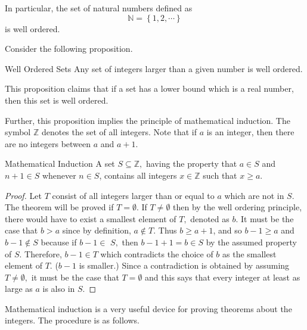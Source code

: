 In particular, the set of natural numbers defined as
\begin{equation*}
\mathbb{N} = \left\{ 1,2,\cdots \right\}
\end{equation*}
is well ordered.

Consider the following proposition.

\begin{proposition}{Well Ordered Sets}\label{prop:wellordered}
Any set of integers larger than a given number is well ordered.
\end{proposition}

This proposition claims that if a set has a lower bound which is a real number, 
then this set is well ordered.

Further, this proposition implies the principle of mathematical induction.
 The symbol $\mathbb{Z}$ denotes the set of all
integers. Note that if $a$ is an integer, then there are no integers between
$a$ and $a+1.$

\begin{theorem}{Mathematical Induction}\label{thm:mathinduction}
 A set $S\subseteq \mathbb{Z},$ having
the property that $a\in S$ and $n+1\in S$ whenever $n\in S$, contains all
integers $x\in \mathbb{Z}$ such that $x\geq a.$
\end{theorem}

\begin{proof} 
Let $T$ consist of all integers larger than or equal to $a$
which are not in $S.$ The theorem will be proved if $T=\emptyset .$ If 
$T\neq \emptyset $ then by the well ordering principle, there would have to
exist a smallest element of $T,$ denoted as $b.$ It must be the case that 
$b>a$ since by definition, $a\notin T.$ Thus $b\geq a+1$, and so $b-1\geq a$
and $b-1\notin S$ because if $b-1\in $ $S,$ then $b-1+1=b\in S$ by the
assumed property of $S.$ Therefore, $b-1\in T$ which contradicts the choice
of $b$ as the smallest element of $T.$ ($b-1$ is smaller.) Since a
contradiction is obtained by assuming $T\neq \emptyset ,$ it must be the
case that $T=\emptyset $ and this says that every integer at least as large
as $a$ is also in $S$.
\end{proof}

Mathematical induction is a very useful device for proving theorems about
the integers. The procedure is as follows.

